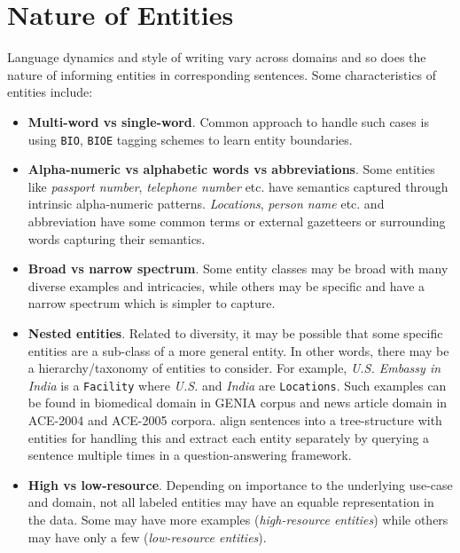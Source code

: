 \section{Nature of Entities}
Language dynamics and style of writing vary across domains and so does the nature of informing entities in corresponding sentences. Some characteristics of entities include:

\begin{itemize}
    \item \textbf{Multi-word vs single-word}. Common approach to handle such cases is using \texttt{BIO}, \texttt{BIOE} tagging schemes to learn entity boundaries.
    
    \item \textbf{Alpha-numeric vs alphabetic words vs abbreviations}. Some entities like \textit{passport number}, \textit{telephone number} etc. have semantics captured through intrinsic alpha-numeric patterns. \textit{Locations}, \textit{person name} etc. and abbreviation have some common terms or external gazetteers or surrounding words capturing their semantics.
    
    \item \textbf{Broad vs narrow spectrum}. Some entity classes may be broad with many diverse examples and intricacies, while others may be specific and have a narrow spectrum which is simpler to capture.
    
    \item \textbf{Nested entities}. Related to diversity, it may be possible that some specific entities are a sub-class of a more general entity. In other words, there may be a hierarchy/taxonomy of entities to consider. For example, \textit{U.S. Embassy in India} is a \texttt{Facility} where \textit{U.S.} and \textit{India} are \texttt{Locations}. Such examples can be found in biomedical domain in GENIA corpus\cite{} and news article domain in ACE-2004\cite{} and ACE-2005\cite{} corpora. \cite{finkel2009nested} align sentences into a tree-structure with entities for handling this and \cite{li2019unified} extract each entity separately by querying a sentence multiple times in a question-answering framework.
    
    \item \textbf{High vs low-resource}. Depending on importance to the underlying use-case and domain, not all labeled entities may have an equable representation in the data. Some may have more examples (\textit{high-resource entities}) while others may have only a few (\textit{low-resource entities}). 
    
\end{itemize}

